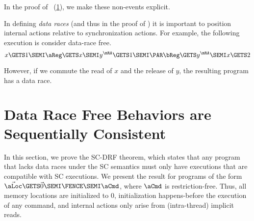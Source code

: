 In the proof of \drfsc\ (\textsection\ref{sec:sc}), we make
these non-events explicit.

In defining \emph{data races} (and thus in the proof of \drfsc) it is
important to position internal actions relative to synchronization actions.
For example, the following execution is consider data-race free.
\begin{displaymath}
  x\GETS1\SEMI
  \aReg\GETS x \SEMI
  y^\mRA\GETS 1 \SEMI
  \PAR
  \bReg\GETS y^\mRA \SEMI
  x\GETS 2
\end{displaymath}
\begin{tikzdisplay}[node distance=1em]
\end{tikzdisplay}
However, if we commute the read of $x$ and the release of $y$, the resulting
program has a data race.

\section{Data Race Free Behaviors are Sequentially Consistent}
\label{sec:sc}




In this section, we prove the SC-DRF theorem, which states that any program
that lacks data races under the SC semantics must only have executions that
are compatible with SC executions.  We present the result for programs of the
form $\vec{\aLoc}\GETS\vec{0}\SEMI\FENCE\SEMI\aCmd$, where $\aCmd$ is
restriction-free.  Thus, all memory locations are initialized to $0$,
initialization happens-before the execution of any command, and internal actions only arise from (intra-thread) implicit reads.


